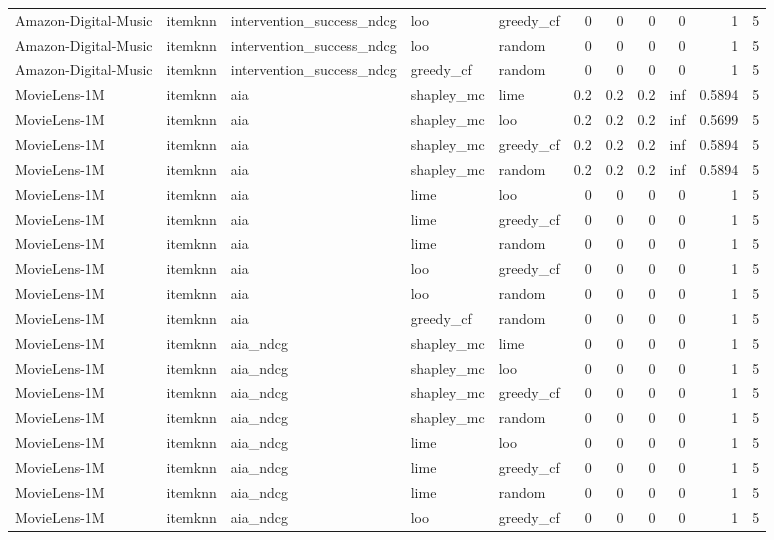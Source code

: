\begin{table}[t]
{\begin{tabular}{lllllrrrrrr}
Amazon-Digital-Music & itemknn & intervention\_success\_ndcg & loo & greedy\_cf & 0 & 0 & 0 & 0 & 1 & 5 \\
Amazon-Digital-Music & itemknn & intervention\_success\_ndcg & loo & random & 0 & 0 & 0 & 0 & 1 & 5 \\
Amazon-Digital-Music & itemknn & intervention\_success\_ndcg & greedy\_cf & random & 0 & 0 & 0 & 0 & 1 & 5 \\
MovieLens-1M & itemknn & aia & shapley\_mc & lime & 0.2 & 0.2 & 0.2 & inf & 0.5894 & 5 \\
MovieLens-1M & itemknn & aia & shapley\_mc & loo & 0.2 & 0.2 & 0.2 & inf & 0.5699 & 5 \\
MovieLens-1M & itemknn & aia & shapley\_mc & greedy\_cf & 0.2 & 0.2 & 0.2 & inf & 0.5894 & 5 \\
MovieLens-1M & itemknn & aia & shapley\_mc & random & 0.2 & 0.2 & 0.2 & inf & 0.5894 & 5 \\
MovieLens-1M & itemknn & aia & lime & loo & 0 & 0 & 0 & 0 & 1 & 5 \\
MovieLens-1M & itemknn & aia & lime & greedy\_cf & 0 & 0 & 0 & 0 & 1 & 5 \\
MovieLens-1M & itemknn & aia & lime & random & 0 & 0 & 0 & 0 & 1 & 5 \\
MovieLens-1M & itemknn & aia & loo & greedy\_cf & 0 & 0 & 0 & 0 & 1 & 5 \\
MovieLens-1M & itemknn & aia & loo & random & 0 & 0 & 0 & 0 & 1 & 5 \\
MovieLens-1M & itemknn & aia & greedy\_cf & random & 0 & 0 & 0 & 0 & 1 & 5 \\
MovieLens-1M & itemknn & aia\_ndcg & shapley\_mc & lime & 0 & 0 & 0 & 0 & 1 & 5 \\
MovieLens-1M & itemknn & aia\_ndcg & shapley\_mc & loo & 0 & 0 & 0 & 0 & 1 & 5 \\
MovieLens-1M & itemknn & aia\_ndcg & shapley\_mc & greedy\_cf & 0 & 0 & 0 & 0 & 1 & 5 \\
MovieLens-1M & itemknn & aia\_ndcg & shapley\_mc & random & 0 & 0 & 0 & 0 & 1 & 5 \\
MovieLens-1M & itemknn & aia\_ndcg & lime & loo & 0 & 0 & 0 & 0 & 1 & 5 \\
MovieLens-1M & itemknn & aia\_ndcg & lime & greedy\_cf & 0 & 0 & 0 & 0 & 1 & 5 \\
MovieLens-1M & itemknn & aia\_ndcg & lime & random & 0 & 0 & 0 & 0 & 1 & 5 \\
MovieLens-1M & itemknn & aia\_ndcg & loo & greedy\_cf & 0 & 0 & 0 & 0 & 1 & 5 \\

\end{tabular}}
\end{table}
